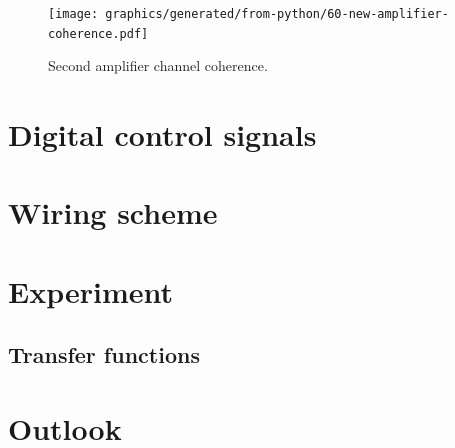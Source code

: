 \begin{figure}
  \centering
  \texttt{[image: graphics/generated/from-python/60-new-amplifier-coherence.pdf]}
  \caption{Second amplifier channel coherence.}
  \label{fig:new-amplifier-coherence}
\end{figure}

\section{Digital control signals}

\section{Wiring scheme}

\section{Experiment}

\subsection{Transfer functions}

\section{Outlook}